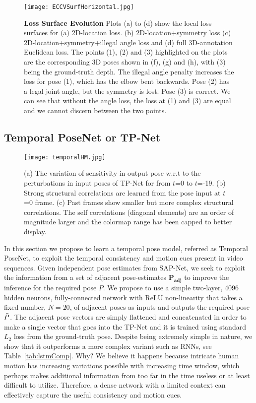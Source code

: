 \documentclass[runningheads]{llncs}
\begin{document}
\begin{figure*}[!h] 
	\centering
	\texttt{[image: ECCVSurfHorizontal.jpg]}
    \caption{\textbf{Loss Surface Evolution} Plots (a) to (d) show the local loss surfaces for (a) 2D-location loss. (b) 2D-location+symmetry loss (c) 2D-location+symmetry+illegal angle loss and (d) full 3D-annotation Euclidean loss. The points (1), (2) and (3) highlighted on the plots are the corresponding 3D poses shown in (f), (g) and (h), with (3) being the ground-truth depth. The illegal angle penalty increases the loss for pose (1), which has the elbow bent backwards. Pose (2) has a legal joint angle, but the symmetry is lost. Pose (3) is correct. We can see that without the angle loss, the loss at (1) and (3) are equal and we cannot discern between the two points.} 
    \vspace{-1em}
    \label{fig:surfEnergy}
\end{figure*}
\vspace{-2em}
\subsection{Temporal PoseNet or TP-Net}
\begin{figure*}[!h]
	\centering
	\texttt{[image: temporalHM.jpg]}
    \caption{(a) The variation of sensitivity in output pose w.r.t to the perturbations in input poses of TP-Net for from $t$=0 to $t$=-19. (b) Strong structural correlations are learned from the pose input at $t$=0 frame. (c) Past frames show smaller but more complex structural correlations. The self correlations (diagonal elements) are an order of magnitude larger and the colormap range has been capped to better display.
    }
    \label{fig:tempInf}
    \vspace{-2em}
\end{figure*}

In this section we propose to learn a temporal pose model, referred as Temporal PoseNet, to exploit the temporal consistency and motion cues present in video sequences. Given independent pose estimates from SAP-Net, we seek to exploit the information from a set of adjacent pose-estimates $\mathbf{P_{adj}}$ to improve the inference for the required pose $P$. We propose to use a simple two-layer, 4096 hidden neurons, fully-connected network with ReLU non-linearity that takes a fixed number, $N=20$, of adjacent poses as inputs and outputs the required pose $\Bar{P}$. The adjacent pose vectors are simply flattened and concatenated in order to make a single vector that goes into the TP-Net and it is trained using standard $L_2$ loss from the ground-truth pose. Despite being extremely simple in nature, we show that it outperforms a more complex variant such as RNNs, see Table~\ref{tab:lstmComp}. Why? We believe it happens because intricate human motion has increasing variations possible with increasing time window, which perhaps makes additional information from too far in the time useless or at least difficult to utilize. Therefore, a dense network with a limited context can effectively capture the useful consistency and motion cues. 
\end{document}
